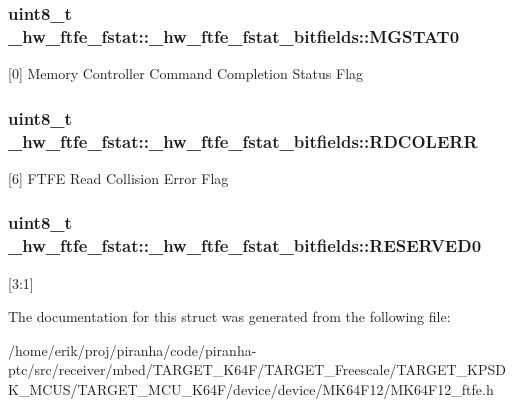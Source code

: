 \subsubsection[{\texorpdfstring{M\+G\+S\+T\+A\+T0}{MGSTAT0}}]{\setlength{\rightskip}{0pt plus 5cm}uint8\+\_\+t \+\_\+hw\+\_\+ftfe\+\_\+fstat\+::\+\_\+hw\+\_\+ftfe\+\_\+fstat\+\_\+bitfields\+::\+M\+G\+S\+T\+A\+T0}\hypertarget{struct__hw__ftfe__fstat_1_1__hw__ftfe__fstat__bitfields_a6a00d5518d472e08b63c91f6530f908e}{}\label{struct__hw__ftfe__fstat_1_1__hw__ftfe__fstat__bitfields_a6a00d5518d472e08b63c91f6530f908e}
\mbox{[}0\mbox{]} Memory Controller Command Completion Status Flag 
\subsubsection[{\texorpdfstring{R\+D\+C\+O\+L\+E\+RR}{RDCOLERR}}]{\setlength{\rightskip}{0pt plus 5cm}uint8\+\_\+t \+\_\+hw\+\_\+ftfe\+\_\+fstat\+::\+\_\+hw\+\_\+ftfe\+\_\+fstat\+\_\+bitfields\+::\+R\+D\+C\+O\+L\+E\+RR}\hypertarget{struct__hw__ftfe__fstat_1_1__hw__ftfe__fstat__bitfields_a4f6b93f9f5dc5cb066478ac0e709820a}{}\label{struct__hw__ftfe__fstat_1_1__hw__ftfe__fstat__bitfields_a4f6b93f9f5dc5cb066478ac0e709820a}
\mbox{[}6\mbox{]} F\+T\+FE Read Collision Error Flag 
\subsubsection[{\texorpdfstring{R\+E\+S\+E\+R\+V\+E\+D0}{RESERVED0}}]{\setlength{\rightskip}{0pt plus 5cm}uint8\+\_\+t \+\_\+hw\+\_\+ftfe\+\_\+fstat\+::\+\_\+hw\+\_\+ftfe\+\_\+fstat\+\_\+bitfields\+::\+R\+E\+S\+E\+R\+V\+E\+D0}\hypertarget{struct__hw__ftfe__fstat_1_1__hw__ftfe__fstat__bitfields_a4b05ce70056e3e21add09b4316d36d9c}{}\label{struct__hw__ftfe__fstat_1_1__hw__ftfe__fstat__bitfields_a4b05ce70056e3e21add09b4316d36d9c}
\mbox{[}3\+:1\mbox{]} 

The documentation for this struct was generated from the following file\+:\begin{DoxyCompactItemize}
\item 
/home/erik/proj/piranha/code/piranha-\/ptc/src/receiver/mbed/\+T\+A\+R\+G\+E\+T\+\_\+\+K64\+F/\+T\+A\+R\+G\+E\+T\+\_\+\+Freescale/\+T\+A\+R\+G\+E\+T\+\_\+\+K\+P\+S\+D\+K\+\_\+\+M\+C\+U\+S/\+T\+A\+R\+G\+E\+T\+\_\+\+M\+C\+U\+\_\+\+K64\+F/device/device/\+M\+K64\+F12/M\+K64\+F12\+\_\+ftfe.\+h\end{DoxyCompactItemize}
